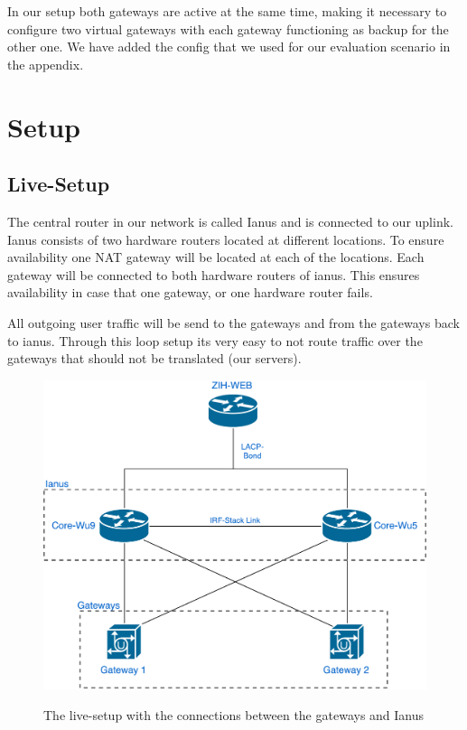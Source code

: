 \documentclass{report}
\begin{document}
In our setup both gateways are active at the same time, making it
necessary to configure two virtual gateways with each gateway
functioning as backup for the other one. We have added the config that
we used for our evaluation scenario in the appendix.


\chapter{Setup}\label{setup}

\section{Live-Setup}\label{live-setup}

The central router in our network is called Ianus and is connected to
our uplink. Ianus consists of two hardware routers located at different
locations. To ensure availability one NAT gateway will be located at
each of the locations. Each gateway will be connected to both hardware
routers of ianus. This ensures availability in case that one gateway, or
one hardware router fails.

All outgoing user traffic will be send to the gateways and from the
gateways back to ianus. Through this loop setup its very easy to not
route traffic over the gateways that should not be translated (our
servers).


\begin{figure}[ht]
	\centering
	\includegraphics[width=\textwidth]{../LiveSetup.pdf}
	\label{LiveSetup.pdf}
	\caption{The live-setup with the connections between the gateways and Ianus}  
\end{figure}
\end{document}
